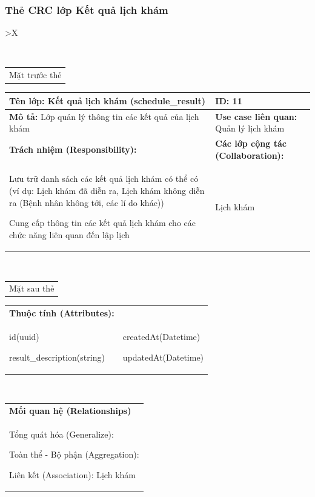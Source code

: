 \subsubsection{Thẻ CRC lớp Kết quả lịch khám}

\begin{xltabular}{\textwidth}{
		>{\centering\arraybackslash}X
	}
	\caption{\bfseries \fontsize{12pt}{0pt}\selectfont Thẻ CRC lớp Kết quả lịch khám}
	\\
	\begin{tabularx}{0.9\textwidth}{X}
		Mặt trước thẻ
	\end{tabularx}
	\begin{tabularx}{0.9\textwidth}{|X|X|}
		\hline
		\textbf{Tên lớp:} Kết quả lịch khám (schedule\_result)          & \textbf{ID:} 11                                 \\
		\hline
		\textbf{Mô tả:} Lớp quản lý thông tin các kết quả của lịch khám & \textbf{Use case liên quan:}  Quản lý lịch khám \\
		\hline
		\textbf{Trách nhiệm (Responsibility):}                          & \textbf{Các lớp cộng tác (Collaboration):}      \\
		Lưu trữ danh sách các kết quả lịch khám có thể có (ví dụ: Lịch khám đã diễn ra, Lịch khám không diễn ra (Bệnh nhân không tới, các lí do khác))

		Cung cấp thông tin các kết quả lịch khám cho các chức năng liên quan đến lập lịch
		                                                                &
		Lịch khám
		\\
		\hline
	\end{tabularx}
	\\
	\begin{tabularx}{0.9\textwidth}{X}
		Mặt sau thẻ
	\end{tabularx}
	\begin{tabularx}{0.9\textwidth}{|X|X|}
		\hline
		\textbf{Thuộc tính (Attributes):} & \\
		id(uuid)

		result\_description(string)
		                                  &
		createdAt(Datetime)

		updatedAt(Datetime)
		\\ \hline
	\end{tabularx}
	\\
	\begin{tabularx}{0.9\textwidth}{|X|}
		\hline
		\textbf{Mối quan hệ (Relationships)} \\
		Tổng quát hóa (Generalize):

		Toàn thể - Bộ phận (Aggregation):

		Liên kết (Association): Lịch khám
		\\
		\hline
	\end{tabularx}
\end{xltabular}


